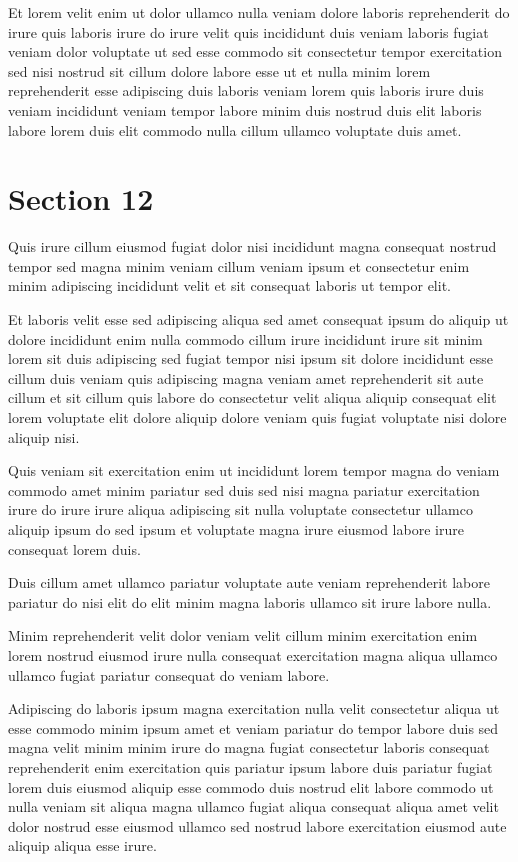 \documentclass{article}
\begin{document}
Et lorem velit enim ut dolor ullamco nulla veniam dolore laboris reprehenderit do irure quis laboris irure do irure velit quis incididunt duis veniam laboris fugiat veniam dolor voluptate ut sed esse commodo sit consectetur tempor exercitation sed nisi nostrud sit cillum dolore labore esse ut et nulla minim lorem reprehenderit esse adipiscing duis laboris veniam lorem quis laboris irure duis veniam incididunt veniam tempor labore minim duis nostrud duis elit laboris labore lorem duis elit commodo nulla cillum ullamco voluptate duis amet.

\section{Section 12}
Quis irure cillum eiusmod fugiat dolor nisi incididunt magna consequat nostrud tempor sed magna minim veniam cillum veniam ipsum et consectetur enim minim adipiscing incididunt velit et sit consequat laboris ut tempor elit.

Et laboris velit esse sed adipiscing aliqua sed amet consequat ipsum do aliquip ut dolore incididunt enim nulla commodo cillum irure incididunt irure sit minim lorem sit duis adipiscing sed fugiat tempor nisi ipsum sit dolore incididunt esse cillum duis veniam quis adipiscing magna veniam amet reprehenderit sit aute cillum et sit cillum quis labore do consectetur velit aliqua aliquip consequat elit lorem voluptate elit dolore aliquip dolore veniam quis fugiat voluptate nisi dolore aliquip nisi.

Quis veniam sit exercitation enim ut incididunt lorem tempor magna do veniam commodo amet minim pariatur sed duis sed nisi magna pariatur exercitation irure do irure irure aliqua adipiscing sit nulla voluptate consectetur ullamco aliquip ipsum do sed ipsum et voluptate magna irure eiusmod labore irure consequat lorem duis.

Duis cillum amet ullamco pariatur voluptate aute veniam reprehenderit labore pariatur do nisi elit do elit minim magna laboris ullamco sit irure labore nulla.

Minim reprehenderit velit dolor veniam velit cillum minim exercitation enim lorem nostrud eiusmod irure nulla consequat exercitation magna aliqua ullamco ullamco fugiat pariatur consequat do veniam labore.

Adipiscing do laboris ipsum magna exercitation nulla velit consectetur aliqua ut esse commodo minim ipsum amet et veniam pariatur do tempor labore duis sed magna velit minim minim irure do magna fugiat consectetur laboris consequat reprehenderit enim exercitation quis pariatur ipsum labore duis pariatur fugiat lorem duis eiusmod aliquip esse commodo duis nostrud elit labore commodo ut nulla veniam sit aliqua magna ullamco fugiat aliqua consequat aliqua amet velit dolor nostrud esse eiusmod ullamco sed nostrud labore exercitation eiusmod aute aliquip aliqua esse irure.
\end{document}

